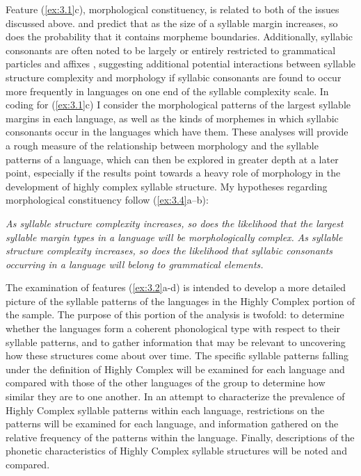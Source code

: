   Feature (\ref{ex:3.1}c), morphological constituency, is related to both of the issues discussed above. \citet[250]{Greenberg19651978} and \citet{DresslerDziubalska-Kołaczyk2006} predict that as the size of a syllable margin increases, so does the probability that it contains morpheme boundaries. Additionally, syllabic consonants are often noted to be largely or entirely restricted to grammatical particles and affixes \citep[159]{Bell1978a}, suggesting additional potential interactions between syllable structure complexity and morphology if syllabic consonants are found to occur more frequently in languages on one end of the syllable complexity scale. In coding for (\ref{ex:3.1}c) I consider the morphological patterns of the largest syllable margins in each language, as well as the kinds of morphemes in which syllabic consonants occur in the languages which have them. These analyses will provide a rough measure of the relationship between morphology and the syllable patterns of a language, which can then be explored in greater depth at a later point, especially if the results point towards a heavy role of morphology in the development of highly complex syllable structure. My hypotheses regarding morphological constituency follow (\ref{ex:3.4}a--b):

\ea\label{ex:3.4}
\ea  \textit{As syllable structure complexity increases, so does the likelihood that the largest syllable margin types in a language will be morphologically complex.} 
\ex  \textit{As syllable structure complexity increases, so does the likelihood that syllabic consonants occurring in a language will belong to grammatical elements.}
\z
\z

  The examination of features (\ref{ex:3.2}a-d) is intended to develop a more detailed picture of the syllable patterns of the languages in the Highly Complex portion of the sample. The purpose of this portion of the analysis is twofold: to determine whether the languages form a coherent phonological type with respect to their syllable patterns, and to gather information that may be relevant to uncovering how these structures come about over time. The specific syllable patterns falling under the definition of Highly Complex will be examined for each language and compared with those of the other languages of the group to determine how similar they are to one another. In an attempt to characterize the prevalence of Highly Complex syllable patterns within each language, restrictions on the patterns will be examined for each language, and information gathered on the relative frequency of the patterns within the language. Finally, descriptions of the phonetic characteristics of Highly Complex syllable structures will be noted and compared.

